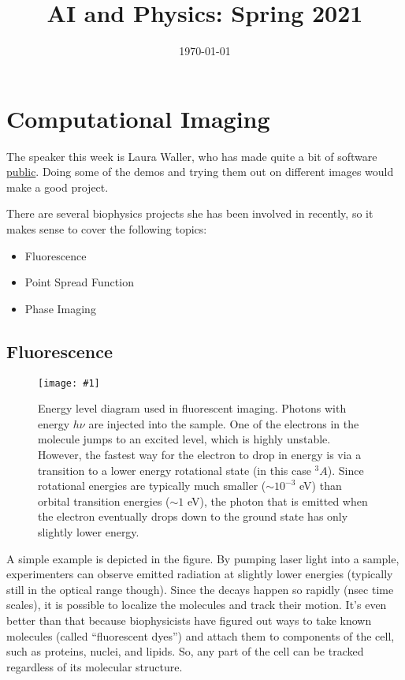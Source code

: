 \documentclass[prd,amsmath,aps,floats,amssymb, floatfix,
  superscriptaddress,nofootinbib]{revtex4-1}
\newcommand{\sfig}[2]{
\texttt{[image: \#1]}
        }
\newcommand{\Spng}[2]{
    \begin{figure}[thbp]
    \sfig{Figures/#1.png}{0.65\columnwidth}
    \caption{{\small #2}}
    \label{fig:#1}
    \end{figure}
}
\numberwithin{equation}{section}
\newcommand\bei{\begin{itemize}}
\newcommand\eei{\end{itemize}}
\begin{document}

\title{AI and Physics: Spring 2021}

%

\date{\today}


\maketitle

\section{Computational Imaging}

The speaker this week is Laura Waller, who has made quite a bit of software \href{http://www.laurawaller.com/opensource/}{public}. Doing some of the demos and trying them out on different images would make a good project.

There are several biophysics projects she has been involved in recently, so it makes sense to cover the following topics:
\bei
\item Fluorescence
\item Point Spread Function
\item Phase Imaging
\eei

\subsection{Fluorescence}

\Spng{JablonskiSimple}{Energy level diagram used in fluorescent imaging. Photons with energy $h\nu$ are injected into the sample. One of the electrons in the molecule jumps to an excited level, which is highly unstable. However, the fastest way for the electron to drop in energy is via a transition to a lower energy rotational state (in this case ${}^3A$). Since rotational energies are typically much smaller ($\sim10^{-3}$ eV) than orbital transition energies ($\sim 1$ eV), the photon that is emitted when the electron eventually drops down to the ground state has only slightly lower energy.}

A simple example is depicted in the figure. By pumping laser light into a sample, experimenters can observe emitted radiation at slightly lower energies (typically still in the optical range though). Since the decays happen so rapidly (nsec time scales), it is possible to localize the molecules and track their motion. It's even better than that because biophysicists have figured out ways to take known molecules (called ``fluorescent dyes'') and attach them to components of the cell, such as proteins, nuclei, and lipids. So, any part of the cell can be tracked regardless of its molecular structure.
\end{document}
